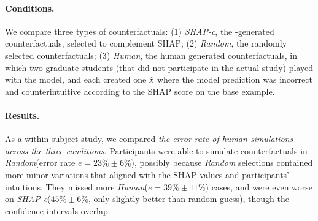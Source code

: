 

\newcommand{\cshap}{\emph{SHAP-c}\xspace}
\newcommand{\crandom}{\emph{Random}\xspace}
\newcommand{\chuman}{\emph{Human}\xspace}
\paragraph{Conditions.} 
We compare three types of counterfactuals:
(1) \cshap, the \sysname-generated counterfactuals, selected to complement SHAP; 
(2) \crandom, the randomly selected \sysname counterfactuals; 
(3) \chuman, the human generated counterfactuals, in which two graduate students (that did not participate in the actual study) played with the model, and each created one $\hat{x}$ where the model prediction was incorrect and counterintuitive according to the SHAP score on the base example.

\paragraph{Results.}
As a within-subject study, we compared \emph{the error rate of human simulations across the three conditions}.
Participants were able to simulate counterfactuals in \crandom (error rate $e=23\%\pm6\%$), possibly because \crandom selections contained more minor variations that aligned with the SHAP values and participants' intuitions.
They missed more \chuman ($e=39\%\pm11\%$) cases, and were even worse on \cshap ($45\%\pm 6\%$, only slightly better than random guess), though the confidence intervals overlap.

